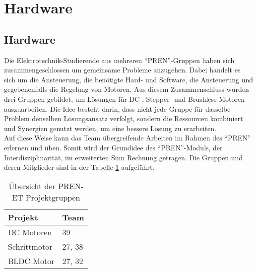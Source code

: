 \ifSTANDALONE
\section{Hardware}
\fi
\ifEMBED
\subsection{Hardware}
\fi
Die Elektrotechnik-Studierende aus mehreren \enquote{PREN}-Gruppen haben sich
zusammengeschlossen um gemeinsame Probleme anzugehen. Dabei handelt es sich
um die Ansteuerung, die benötigte Hard- und Software, die Ansteuerung und gegebenenfalls 
die Regelung von Motoren. Aus diesem Zusammenschluss wurden drei Gruppen
gebildet, um Lösungen für DC-, Stepper- und Brushless-Motoren auszuarbeiten.
Die Idee besteht darin, dass nicht jede Gruppe für dasselbe Problem
denselben Lösungsansatz verfolgt, sondern die Ressourcen kombiniert und
Synergien genutzt werden, um eine bessere Lösung zu erarbeiten. \\
Auf diese Weise kann das Team übergreifende Arbeiten im Rahmen des \enquote{PREN} erlernen und
üben. Somit wird der Grundidee des \enquote{PREN}-Moduls, der Interdisziplinarität, im erweiterten Sinn
Rechnung getragen. Die Gruppen und deren Mitglieder sind in der Tabelle 
\ref{tab:pren-et-overview} aufgeführt.
\begin{table}[h!]
	\centering
	\begin{tabular}{l l}
		Projekt		& Team \\
		\hline
		DC Motoren	& 39 \\
		Schrittmotor	& 27, 38 \\
		BLDC Motor	& 27, 32 \\
	\end{tabular}
	\caption{Übersicht der PREN-ET Projektgruppen}
	\label{tab:pren-et-overview}
\end{table}
